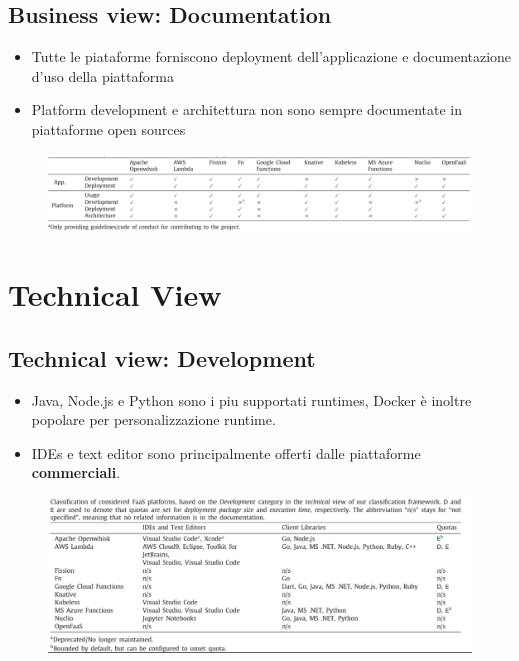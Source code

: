 \documentclass[a4paper, 12pt]{report}
\begin{document}
            \subsection{Business view: Documentation}
            \begin{itemize}
              \item Tutte le piataforme forniscono deployment dell'applicazione e documentazione d'uso della piattaforma 
              \item Platform development e architettura non sono sempre documentate in piattaforme open sources
            \end{itemize}
            \begin{figure}[h]
              \centering
              \includegraphics[scale=0.3]{Immagini/Documentation.png}
            \end{figure}
            \clearpage
            \section{Technical View}
            \subsection{Technical view: Development}
            \begin{itemize}
              \item Java, Node.js e Python sono i piu supportati runtimes, Docker è inoltre popolare per personalizzazione runtime. 
              \item IDEs e text editor sono principalmente offerti dalle piattaforme \textbf{commerciali}.
            \end{itemize}
            \begin{figure}[h]
              \centering
              \includegraphics[scale=0.35]{Immagini/Development.png}
            \end{figure}
\end{document}
